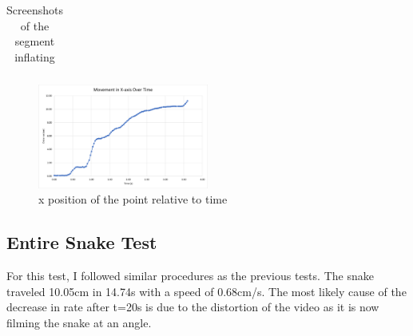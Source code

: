 \documentclass[twoside, 11pt]{article}
\begin{document}
\begin{table} [H]
\begin{tabular}{|c|c|c|c|}
	\hline
	\end{tabular}
	\caption{Screenshots of the segment inflating}
\end{table}
\begin{figure} [H]
\centering
\includegraphics[width=0.5\textwidth]{two seg}
\caption{x position of the point relative to time}
\end{figure}


\subsection{Entire Snake Test}
For this test, I followed similar procedures as the previous tests. The snake traveled 10.05cm in 14.74s with a speed of 0.68cm/s. The most likely cause of the decrease in rate after t=20s is due to the distortion of the video as it is now filming the snake at an angle. 
\end{document}
